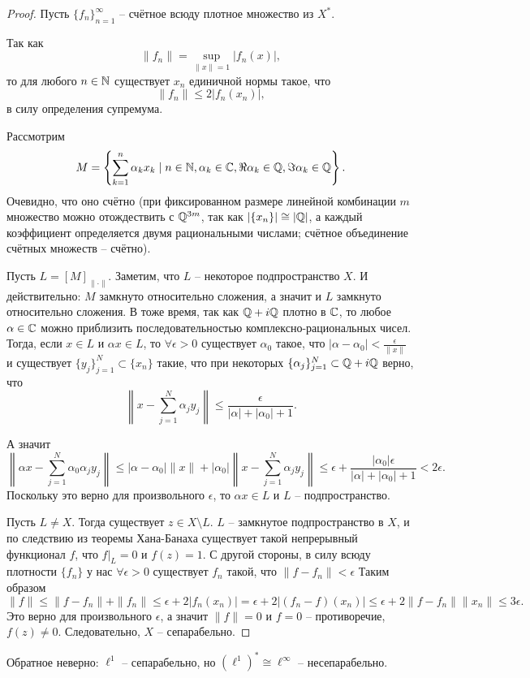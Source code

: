 \begin{proof}
    Пусть $\{f_n\}_{n = 1}^{\infty}$ -- счётное всюду плотное множество из $X^*$.

    Так как
    \[
        \|f_n\| = \sup\limits_{\|x \| = 1} |f_n(x)|,
    \]
    то для любого $n \in \mathbb{N}$ существует $x_n$ единичной нормы такое, что
    \[
        \|f_n\| \leq 2|f_n(x_n)|,
    \]
    в силу определения супремума.

    Рассмотрим
    \[
        M = \left\{\sum_{k = 1}^{n} \alpha_k x_k \mid n \in \mathbb{N}, \alpha_k \in \mathbb{C}, \Re \alpha_k \in \mathbb{Q}, \Im \alpha_k \in \mathbb{Q}\right\}.
    \]
    Очевидно, что оно счётно (при фиксированном размере линейной комбинации $m$ множество можно отождествить с $\mathbb{Q}^{3m}$, так как $|\{x_n\}| \cong |\mathbb{Q}|$, а каждый коэффициент определяется двумя рациональными числами; счётное объединение счётных множеств -- счётно).

    Пусть $L = [M]_{\|\cdot\|}$.
    Заметим, что $L$ -- некоторое подпространство $X$.
    И действительно: $M$ замкнуто относительно сложения, а значит и $L$ замкнуто относительно сложения.
    В тоже время, так как $\mathbb{Q} + i\mathbb{Q}$ плотно в $\mathbb{C}$, то любое $\alpha \in \mathbb{C}$ можно приблизить последовательностью комплексно-рациональных чисел.
    Тогда, если $x \in L$ и $\alpha x \in L$, то $\forall \epsilon > 0$ существует $\alpha_0$ такое, что $|\alpha - \alpha_0| < \frac{\epsilon}{\|x\|}$ и существует $\{y_j\}_{j = 1}^{N} \subset \{x_n\}$ такие, что при некоторых $\{\alpha_j\}_{j = 1}^{N} \subset \mathbb{Q} + i\mathbb{Q}$ верно, что
    \[
        \left\|x - \sum_{j = 1}^{N} \alpha_j y_j\right\| \leq \frac{\epsilon}{|\alpha| + |\alpha_0| + 1}.
    \]

    А значит
    \[
        \left\|\alpha x - \sum_{j = 1}^{N}\alpha_0 \alpha_j y_j\right\| \leq |\alpha - \alpha_0|\|x\| + |\alpha_0|\left\|x - \sum_{j = 1}^{N} \alpha_j y_j \right\| \leq \epsilon + \frac{|\alpha_0|\epsilon}{|\alpha| + |\alpha_0| + 1} < 2\epsilon.
    \]
    Поскольку это верно для произвольного $\epsilon$, то $\alpha x \in L$ и $L$ -- подпространство.

    Пусть $L \neq X$.
    Тогда существует $z \in X \setminus L$.
    $L$ -- замкнутое подпространство в $X$, и по следствию из теоремы Хана-Банаха существует такой непрерывный функционал $f$, что $f|_{L} = 0$ и $f(z) = 1$.
    С другой стороны, в силу всюду плотности $\{f_n\}$ у нас $\forall \epsilon > 0$ существует $f_n$ такой, что $\|f - f_n\| < \epsilon$
    Таким образом
    \[
        \|f\| \leq \|f - f_n\| + \|f_n\| \leq \epsilon + 2|f_n(x_n)| = \epsilon + 2|(f_n - f)(x_n)| \leq \epsilon + 2\|f - f_n\|\|x_n\| \leq 3\epsilon.
    \]
    Это верно для произвольного $\epsilon$, а значит $\|f\| = 0$ и $f = 0$ -- противоречие, $f(z) \neq 0$.
    Следовательно, $X$ -- сепарабельно.
\end{proof}
\begin{note}
    Обратное неверно: $\ell^1$ -- сепарабельно, но $(\ell^1)^* \cong \ell^\infty$ -- несепарабельно.
\end{note}
